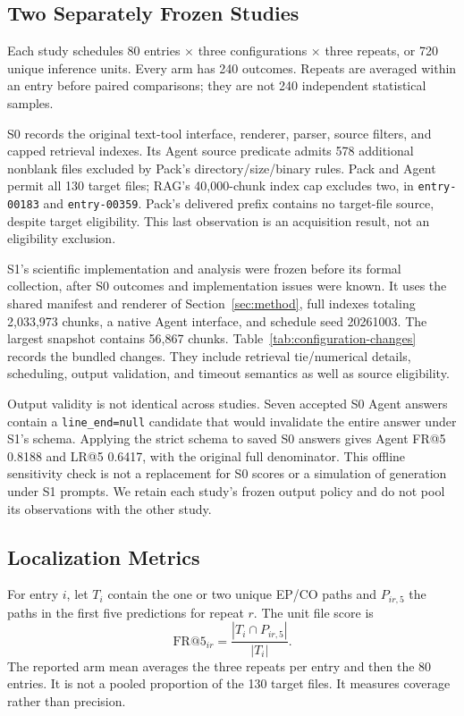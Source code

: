\subsection{Two Separately Frozen Studies}
Each study schedules 80 entries $\times$ three configurations $\times$ three repeats, or 720 unique inference units. Every arm has 240 outcomes. Repeats are averaged within an entry before paired comparisons; they are not 240 independent statistical samples.

S0 records the original text-tool interface, renderer, parser, source filters, and capped retrieval indexes. Its Agent source predicate admits 578 additional nonblank files excluded by Pack's directory/size/binary rules. Pack and Agent permit all 130 target files; RAG's 40,000-chunk index cap excludes two, in \texttt{entry-00183} and \texttt{entry-00359}. Pack's delivered prefix contains no target-file source, despite target eligibility. This last observation is an acquisition result, not an eligibility exclusion.

S1's scientific implementation and analysis were frozen before its formal collection, after S0 outcomes and implementation issues were known. It uses the shared manifest and renderer of Section~\ref{sec:method}, full indexes totaling 2,033,973 chunks, a native Agent interface, and schedule seed 20261003. The largest snapshot contains 56,867 chunks. Table~\ref{tab:configuration-changes} records the bundled changes. They include retrieval tie/numerical details, scheduling, output validation, and timeout semantics as well as source eligibility.


Output validity is not identical across studies. Seven accepted S0 Agent answers contain a \texttt{line\_end=null} candidate that would invalidate the entire answer under S1's schema. Applying the strict schema to saved S0 answers gives Agent FR@5 0.8188 and LR@5 0.6417, with the original full denominator. This offline sensitivity check is not a replacement for S0 scores or a simulation of generation under S1 prompts. We retain each study's frozen output policy and do not pool its observations with the other study.

\subsection{Localization Metrics}
For entry $i$, let $T_i$ contain the one or two unique EP/CO paths and $P_{ir,5}$ the paths in the first five predictions for repeat $r$. The unit file score is
\begin{equation}
 \mathrm{FR@5}_{ir}=\frac{|T_i\cap P_{ir,5}|}{|T_i|}.
\end{equation}
The reported arm mean averages the three repeats per entry and then the 80 entries. It is not a pooled proportion of the 130 target files. It measures coverage rather than precision.

